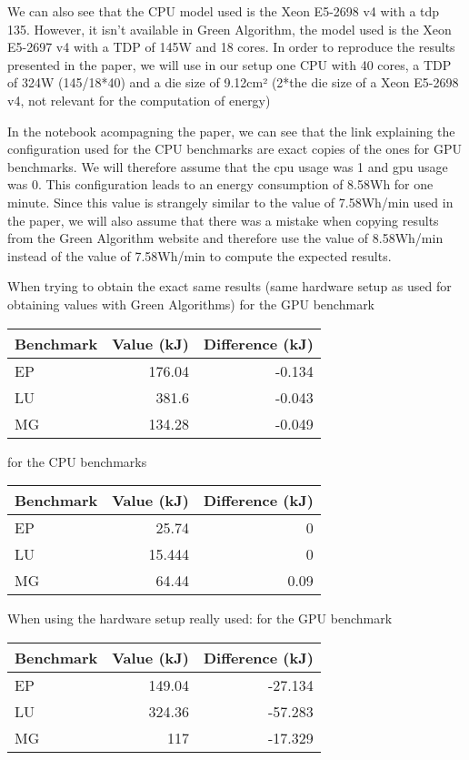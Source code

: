 \documentclass[11pt]{article}
\begin{document}
We can also see that the CPU model used is the Xeon E5-2698 v4 with a
tdp 135. However, it isn't available in Green Algorithm, the model
used is the Xeon E5-2697 v4 with a TDP of 145W and 18 cores.
In order to reproduce the results presented in the paper, we will use
in our setup one CPU with 40 cores, a TDP of 324W (145/18*40) and a
die size of 9.12cm² (2*the die size of a Xeon E5-2698 v4, not relevant
for the computation of energy)

In the notebook acompagning the paper, we can see that the link explaining the configuration used for the CPU benchmarks are
exact copies of the ones for GPU benchmarks. We will therefore assume
that the cpu usage was 1 and gpu usage was 0. This configuration leads
to an energy consumption of 8.58Wh for one minute. Since this value is
strangely similar to the value of 7.58Wh/min used in the paper, we will also assume that there was a mistake when copying
results from the Green Algorithm website and therefore use the value
of 8.58Wh/min instead of the value of 7.58Wh/min to compute the
expected results.

When trying to obtain the exact same results (same hardware setup as used for
obtaining values with Green Algorithms)
for the GPU benchmark
\begin{center}
\begin{tabular}{lrr}
Benchmark & Value (kJ) & Difference (kJ)\\
\hline
EP & 176.04 & -0.134\\
LU & 381.6 & -0.043\\
MG & 134.28 & -0.049\\
\end{tabular}
\end{center}

for the CPU benchmarks
\begin{center}
\begin{tabular}{lrr}
Benchmark & Value (kJ) & Difference (kJ)\\
\hline
EP & 25.74 & 0\\
LU & 15.444 & 0\\
MG & 64.44 & 0.09\\
\end{tabular}
\end{center}


When using the hardware setup really used:
for the GPU benchmark
\begin{center}
\begin{tabular}{lrr}
Benchmark & Value (kJ) & Difference (kJ)\\
\hline
EP & 149.04 & -27.134\\
LU & 324.36 & -57.283\\
MG & 117 & -17.329\\
\end{tabular}
\end{center}
\end{document}
